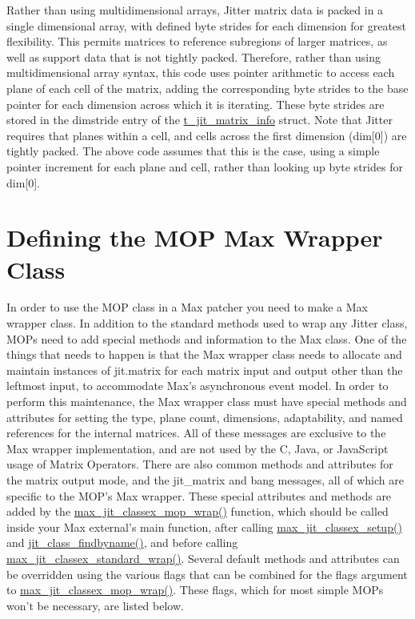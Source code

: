 Rather than using multidimensional arrays, Jitter matrix data is packed in a single dimensional array, with defined byte strides for each dimension for greatest flexibility. This permits matrices to reference subregions of larger matrices, as well as support data that is not tightly packed. Therefore, rather than using multidimensional array syntax, this code uses pointer arithmetic to access each plane of each cell of the matrix, adding the corresponding byte strides to the base pointer for each dimension across which it is iterating. These byte strides are stored in the dimstride entry of the \hyperlink{structt__jit__matrix__info}{t\_\-jit\_\-matrix\_\-info} struct. Note that Jitter requires that planes within a cell, and cells across the first dimension (dim\mbox{[}0\mbox{]}) are tightly packed. The above code assumes that this is the case, using a simple pointer increment for each plane and cell, rather than looking up byte strides for dim\mbox{[}0\mbox{]}.\hypertarget{chapter_jit_mopqs_chapter_jit_mopqs_wrapperdef}{}\section{Defining the MOP Max Wrapper Class}\label{chapter_jit_mopqs_chapter_jit_mopqs_wrapperdef}
In order to use the MOP class in a Max patcher you need to make a Max wrapper class. In addition to the standard methods used to wrap any Jitter class, MOPs need to add special methods and information to the Max class. One of the things that needs to happen is that the Max wrapper class needs to allocate and maintain instances of jit.matrix for each matrix input and output other than the leftmost input, to accommodate Max's asynchronous event model. In order to perform this maintenance, the Max wrapper class must have special methods and attributes for setting the type, plane count, dimensions, adaptability, and named references for the internal matrices. All of these messages are exclusive to the Max wrapper implementation, and are not used by the C, Java, or JavaScript usage of Matrix Operators. There are also common methods and attributes for the matrix output mode, and the jit\_\-matrix and bang messages, all of which are specific to the MOP's Max wrapper. These special attributes and methods are added by the \hyperlink{group__maxmopmod_ga7e08584771f58ce1fe0b190d27b5759b}{max\_\-jit\_\-classex\_\-mop\_\-wrap()} function, which should be called inside your Max external's main function, after calling \hyperlink{group__maxwrapmod_ga773b6e6430d9de2e295419c7f038979e}{max\_\-jit\_\-classex\_\-setup()} and \hyperlink{group__classmod_ga63eb9d25f881cd6fba11e24f9ac9b02f}{jit\_\-class\_\-findbyname()}, and before calling \hyperlink{group__maxwrapmod_ga9b8377bdccc2497e02582c72204b5250}{max\_\-jit\_\-classex\_\-standard\_\-wrap()}. Several default methods and attributes can be overridden using the various flags that can be combined for the flags argument to \hyperlink{group__maxmopmod_ga7e08584771f58ce1fe0b190d27b5759b}{max\_\-jit\_\-classex\_\-mop\_\-wrap()}. These flags, which for most simple MOPs won't be necessary, are listed below.


